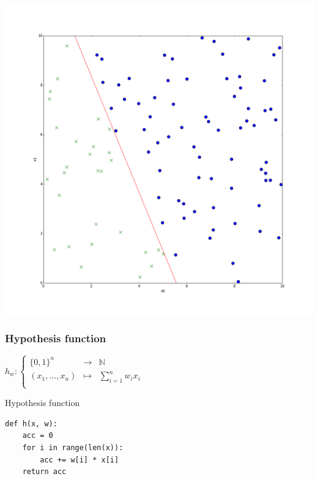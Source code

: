 \begin{frame}
  \begin{center}
    \includegraphics[scale=0.2]{./pictures/logreg_db078.png}
  \end{center}
\end{frame}

\begin{frame}
  \frametitle{Hypothesis function}
  $h_w:
  \left \{
    \begin{array}{ccc}
      \{0, 1\}^n & \to & \mathbb{N} \\
      (x_1, \ldots, x_{n}) & \mapsto &
      \displaystyle\sum_{i=1}^n{w_i x_i} \\
    \end{array}
  \right.$
\end{frame}

\begin{frame}[fragile]
  \begin{block}{Hypothesis function}
      \begin{lstlisting}
def h(x, w):
    acc = 0
    for i in range(len(x)):
        acc += w[i] * x[i]
    return acc
      \end{lstlisting}
  \end{block}
\end{frame}

